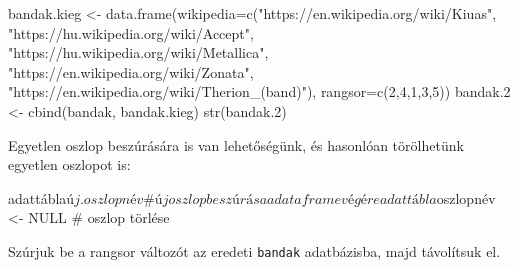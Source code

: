 \documentclass[
]{book}
\newenvironment{Shaded}{\begin{snugshade}}{\end{snugshade}}
\newcommand{\AttributeTok}[1]{\textcolor[rgb]{0.77,0.63,0.00}{#1}}
\newcommand{\CommentTok}[1]{\textcolor[rgb]{0.56,0.35,0.01}{\textit{#1}}}
\newcommand{\ConstantTok}[1]{\textcolor[rgb]{0.00,0.00,0.00}{#1}}
\newcommand{\DecValTok}[1]{\textcolor[rgb]{0.00,0.00,0.81}{#1}}
\newcommand{\FloatTok}[1]{\textcolor[rgb]{0.00,0.00,0.81}{#1}}
\newcommand{\FunctionTok}[1]{\textcolor[rgb]{0.00,0.00,0.00}{#1}}
\newcommand{\NormalTok}[1]{#1}
\newcommand{\OtherTok}[1]{\textcolor[rgb]{0.56,0.35,0.01}{#1}}
\newcommand{\SpecialCharTok}[1]{\textcolor[rgb]{0.00,0.00,0.00}{#1}}
\newcommand{\StringTok}[1]{\textcolor[rgb]{0.31,0.60,0.02}{#1}}
\begin{document}
\begin{Shaded}
\begin{Highlighting}[]
\NormalTok{bandak.kieg }\OtherTok{\textless{}{-}} \FunctionTok{data.frame}\NormalTok{(}\AttributeTok{wikipedia=}\FunctionTok{c}\NormalTok{(}\StringTok{"https://en.wikipedia.org/wiki/Kiuas"}\NormalTok{,}
                                      \StringTok{"https://hu.wikipedia.org/wiki/Accept"}\NormalTok{,}
                                      \StringTok{"https://hu.wikipedia.org/wiki/Metallica"}\NormalTok{,}
                                      \StringTok{"https://en.wikipedia.org/wiki/Zonata"}\NormalTok{,}
                                      \StringTok{"https://en.wikipedia.org/wiki/Therion\_(band)"}\NormalTok{),}
                          \AttributeTok{rangsor=}\FunctionTok{c}\NormalTok{(}\DecValTok{2}\NormalTok{,}\DecValTok{4}\NormalTok{,}\DecValTok{1}\NormalTok{,}\DecValTok{3}\NormalTok{,}\DecValTok{5}\NormalTok{))}
\NormalTok{bandak}\FloatTok{.2} \OtherTok{\textless{}{-}} \FunctionTok{cbind}\NormalTok{(bandak, bandak.kieg)}
\FunctionTok{str}\NormalTok{(bandak}\FloatTok{.2}\NormalTok{)}
\end{Highlighting}
\end{Shaded}

Egyetlen oszlop beszúrására is van lehetőségünk, és hasonlóan törölhetünk egyetlen oszlopot is:

\begin{Shaded}
\begin{Highlighting}[]
\NormalTok{adattábla$új.oszlopnév       \# új oszlop beszúrása a dataframe végére}
\NormalTok{adattábla$oszlopnév \textless{}{-} NULL  \# oszlop törlése}
\end{Highlighting}
\end{Shaded}

Szúrjuk be a rangsor változót az eredeti \texttt{bandak} adatbázisba, majd távolítsuk el.

\begin{Shaded}
\end{Shaded}
\end{document}
